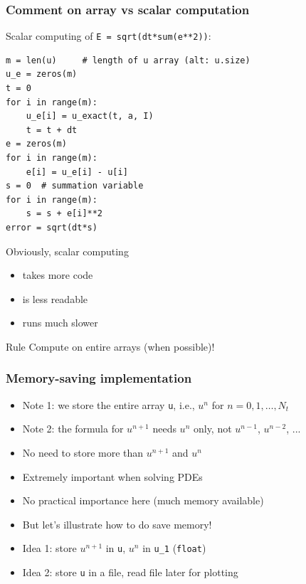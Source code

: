 \documentclass{beamer}
\begin{document}
\begin{frame}
\frametitle{Comment on array vs scalar computation}

Scalar computing of \texttt{E = sqrt(dt*sum(e**2))}:

\begin{verbatim}
m = len(u)     # length of u array (alt: u.size)
u_e = zeros(m)
t = 0
for i in range(m):
    u_e[i] = u_exact(t, a, I)
    t = t + dt
e = zeros(m)
for i in range(m):
    e[i] = u_e[i] - u[i]
s = 0  # summation variable
for i in range(m):
    s = s + e[i]**2
error = sqrt(dt*s)
\end{verbatim}
Obviously, scalar computing

\begin{itemize}
 \item takes more code

 \item is less readable

 \item runs much slower
\end{itemize}

\noindent
\begin{block}{Rule }
Compute on entire arrays (when possible)!
\end{block}
\end{frame}

\begin{frame}
\frametitle{Memory-saving implementation}

\begin{itemize}
 \item Note 1: we store the entire array \texttt{u}, i.e., $u^n$ for $n=0,1,\ldots,N_t$

 \item Note 2: the formula for $u^{n+1}$ needs $u^n$ only, not $u^{n-1}$, $u^{n-2}$, ...

 \item No need to store more than $u^{n+1}$ and $u^{n}$

 \item Extremely important when solving PDEs

 \item No practical importance here (much memory available)

 \item But let's illustrate how to do save memory!

 \item Idea 1: store $u^{n+1}$ in \texttt{u}, $u^n$ in \Verb!u_1! (\texttt{float})

 \item Idea 2: store \texttt{u} in a file, read file later for plotting
\end{itemize}

\noindent
\end{frame}
\end{document}
